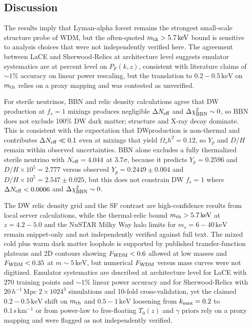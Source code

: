 \documentclass[11pt,a4paper]{article}
\begin{document}
\subsection{Discussion}
The results imply that Lyman-alpha forest remains the strongest small-scale structure probe of WDM, but the often-quoted $m_{\rm th} > 5.7\,\mathrm{keV}$ bound is sensitive to analysis choices that were not independently verified here. The agreement between LaCE and Sherwood-Relics at architecture level suggests emulator systematics are at percent level on $P_F(k,z)$, consistent with literature claims of $\sim 1\%$ accuracy on linear power rescaling, but the translation to $0.2-0.5\,\mathrm{keV}$ on $m_{\rm th}$ relies on a proxy mapping and was contested as unverified.

For sterile neutrinos, BBN and relic density calculations agree that DW production at $f_s=1$ mixings produces negligible $\Delta N_{\rm eff}$ and $\Delta\chi^2_{\rm BBN} \sim 0$, so BBN does not exclude 100\% DW dark matter; structure and X-ray decay dominate. This is consistent with the expectation that DWproduction is non-thermal and contributes $\Delta N_{\rm eff} \ll 0.1$ even at mixings that yield $\Omega_s h^2 = 0.12$, so $Y_p$ and $D/H$ remain within observed uncertainties. BBN alone excludes a fully thermalized sterile neutrino with $N_{\rm eff} = 4.044$ at $3.7\sigma$, because it predicts $Y_p = 0.2596$ and $D/H \times 10^5 = 2.777$ versus observed $Y_p = 0.2449 \pm 0.004$ and $D/H \times 10^5 = 2.547 \pm 0.025$, but this does not constrain DW $f_s = 1$ where $\Delta N_{\rm eff} < 0.0006$ and $\Delta\chi^2_{\rm BBN} \sim 0$.

The DW relic density grid and the SF contrast are high-confidence results from local server calculations, while the thermal-relic bound $m_{\rm th} > 5.7\,\mathrm{keV}$ at $z = 4.2-5.0$ and the NuSTAR Milky Way halo limits for $m_s = 6-40\,\mathrm{keV}$ remain snippet-only and not independently verified against full text. The mixed cold plus warm dark matter loophole is supported by published transfer-function plateaus and 2D contours showing $F_{\rm WDM} < 0.6$ allowed at low masses and $F_{\rm WDM} < 0.35$ at $m \sim 5\,\mathrm{keV}$, but numerical $F_{\rm WDM}$ versus mass curves were not digitized. Emulator systematics are described at architecture level for LaCE with $270$ training points and $\sim 1\%$ linear power accuracy and for Sherwood-Relics with $20\,h^{-1}\,\mathrm{Mpc}$ $2\times1024^3$ simulations and 10-fold cross-validation, yet the claimed $0.2-0.5\,\mathrm{keV}$ shift on $m_{\rm th}$ and $0.5-1\,\mathrm{keV}$ loosening from $k_{\rm max} = 0.2$ to $0.1\,\mathrm{s\,km^{-1}}$ or from power-law to free-floating $T_0(z)$ and $\gamma$ priors rely on a proxy mapping and were flagged as not independently verified.
\end{document}
